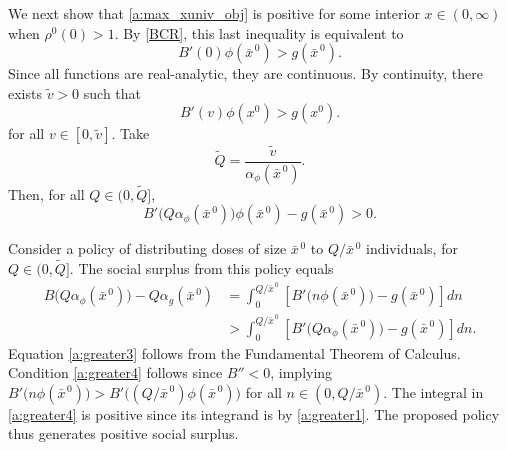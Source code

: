 \documentclass[12pt]{article}
\newcommand{\efficacy}{\phi}
\newcommand{\general}{g}
\newcommand{\benefit}{B}
\newcommand{\ratio}{\rho^0\!}
\newcommand{\xno}{x^{0}}
\newcommand{\xnobar}{\bar{x}^{\,0}}
\newcommand{\perunit}[1]{\alpha_{#1}}
\newcommand{\Qtilde}{\tilde{Q}}
\newcommand{\vtilde}{\tilde{v}}
\begin{document}
We next show that \eqref{a:max_xuniv_obj} is positive for some
interior $x \in (0, \infty)$ when $\ratio(0) > 1$. By \eqref{BCR},
this last inequality is equivalent to
\begin{equation}
\label{a:BCRarrange0}
\benefit'(0) \efficacy(\xnobar) > \general(\xnobar).
\end{equation}
Since all functions are real-analytic, they are continuous. By
continuity, there exists $\vtilde > 0$ such that
\begin{equation}
\label{a:BCRarrangev}
\benefit'(v) \efficacy(\xno) > \general(\xno).
\end{equation}
for all $v \in [0, \vtilde]$. Take 
\begin{equation}
\label{a:Qprime}
\Qtilde = \frac{\vtilde}{\perunit{\efficacy}\!(\xnobar)}.  
\end{equation} 
Then, for all $Q \in (0, \Qtilde]$, 
\begin{equation}
\label{a:greater1}
\benefit' \! \bigl( Q \perunit{\efficacy}\!(\xnobar) \bigr)
\efficacy(\xnobar) - \general(\xnobar) > 0.
\end{equation}

Consider a policy of distributing doses of size $\xnobar$ to $Q /
\xnobar$ individuals, for $Q \in (0, \Qtilde]$. The social surplus
from this policy equals
\begin{align}
\benefit \bigl( Q \perunit{\efficacy}\!(\xnobar) \bigr) - Q \perunit{\general}\!(\xnobar) 
& = \int_0^{Q/\xnobar} \left[ \benefit' \! \bigl( n \efficacy(\xnobar) \bigr) - \general(\xnobar) \right] dn \label{a:greater2} \\
& > \int_0^{Q/\xnobar} \left[ \benefit' \! \bigl( Q \perunit{\efficacy}\!(\xnobar) \bigr) - \general(\xnobar) \right] dn. \label{a:greater3} 
\end{align}
Equation \eqref{a:greater3} follows from the Fundamental Theorem of
Calculus. Condition \eqref{a:greater4} follows since $\benefit'' < 0$,
implying $\benefit' \! \bigl( n \efficacy(\xnobar) \bigr) > \benefit'
\! \bigl( (Q/\xnobar)\efficacy(\xnobar) \bigr)$ for all $n \in (0,
Q/\xnobar)$. The integral in \eqref{a:greater4} is positive since its
integrand is by \eqref{a:greater1}. The proposed policy thus generates
positive social surplus.
\end{document}
